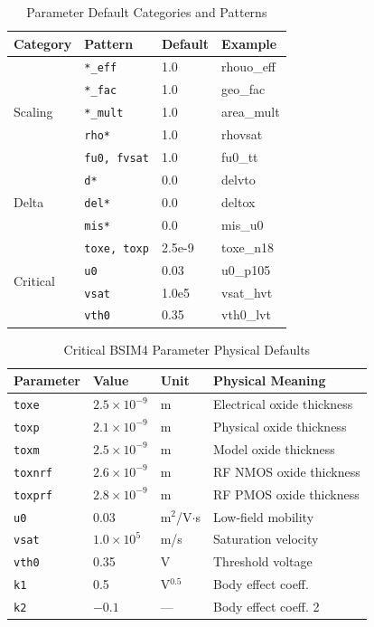 \documentclass[10pt,twocolumn]{article}
\begin{document}
\begin{table}[!t]
\caption{Parameter Default Categories and Patterns}
\label{tab:default_categories_appendix}
\centering
\renewcommand{\arraystretch}{1.15}
\begin{tabular}{@{}llll@{}}
\toprule
\textbf{Category} & \textbf{Pattern} & \textbf{Default} & \textbf{Example} \\
\midrule
\multirow{5}{*}{Scaling} & \texttt{*\_eff} & 1.0 & rhouo\_eff \\
 & \texttt{*\_fac} & 1.0 & geo\_fac \\
 & \texttt{*\_mult} & 1.0 & area\_mult \\
 & \texttt{rho*} & 1.0 & rhovsat \\
 & \texttt{fu0, fvsat} & 1.0 & fu0\_tt \\
\midrule
\multirow{3}{*}{Delta} & \texttt{d*} & 0.0 & delvto \\
 & \texttt{del*} & 0.0 & deltox \\
 & \texttt{mis*} & 0.0 & mis\_u0 \\
\midrule
\multirow{4}{*}{Critical} & \texttt{toxe, toxp} & 2.5e-9 & toxe\_n18 \\
 & \texttt{u0} & 0.03 & u0\_p105 \\
 & \texttt{vsat} & 1.0e5 & vsat\_hvt \\
 & \texttt{vth0} & 0.35 & vth0\_lvt \\
\bottomrule
\end{tabular}
\end{table}

\begin{table}[!t]
\caption{Critical BSIM4 Parameter Physical Defaults}
\label{tab:critical_params_appendix}
\centering
\renewcommand{\arraystretch}{1.15}
\begin{tabular}{@{}llll@{}}
\toprule
\textbf{Parameter} & \textbf{Value} & \textbf{Unit} & \textbf{Physical Meaning} \\
\midrule
\texttt{toxe} & $2.5\times10^{-9}$ & m & Electrical oxide thickness \\
\texttt{toxp} & $2.1\times10^{-9}$ & m & Physical oxide thickness \\
\texttt{toxm} & $2.5\times10^{-9}$ & m & Model oxide thickness \\
\texttt{toxnrf} & $2.6\times10^{-9}$ & m & RF NMOS oxide thickness \\
\texttt{toxprf} & $2.8\times10^{-9}$ & m & RF PMOS oxide thickness \\
\midrule
\texttt{u0} & 0.03 & m$^2$/V$\cdot$s & Low-field mobility \\
\texttt{vsat} & $1.0\times10^{5}$ & m/s & Saturation velocity \\
\texttt{vth0} & 0.35 & V & Threshold voltage \\
\texttt{k1} & 0.5 & V$^{0.5}$ & Body effect coeff. \\
\texttt{k2} & $-0.1$ & --- & Body effect coeff. 2 \\
\bottomrule
\end{tabular}
\end{table}
\end{document}
